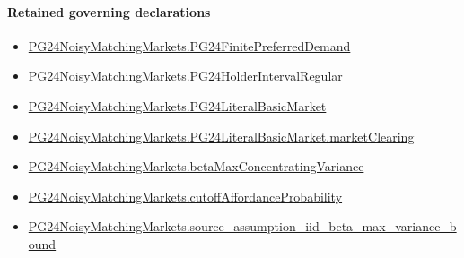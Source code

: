 \documentclass[10pt]{article}
\begin{document}
\paragraph{Retained governing declarations}
\begin{itemize}\raggedright
\item \hyperlink{governing-declaration-5abddabcc3314102}{PG24\allowbreak{}Noisy\allowbreak{}Matching\allowbreak{}Markets.\allowbreak{}PG24\allowbreak{}Finite\allowbreak{}Preferred\allowbreak{}Demand}
\item \hyperlink{governing-declaration-34ba25842cf90e86}{PG24\allowbreak{}Noisy\allowbreak{}Matching\allowbreak{}Markets.\allowbreak{}PG24\allowbreak{}Holder\allowbreak{}Interval\allowbreak{}Regular}
\item \hyperlink{paper-prerequisite-c7f1778ccec10a69}{PG24\allowbreak{}Noisy\allowbreak{}Matching\allowbreak{}Markets.\allowbreak{}PG24\allowbreak{}Literal\allowbreak{}Basic\allowbreak{}Market}
\item \hyperlink{governing-declaration-61d8d4911d878de6}{PG24\allowbreak{}Noisy\allowbreak{}Matching\allowbreak{}Markets.\allowbreak{}PG24\allowbreak{}Literal\allowbreak{}Basic\allowbreak{}Market.\allowbreak{}market\allowbreak{}Clearing}
\item \hyperlink{governing-declaration-322e8322d17fd70c}{PG24\allowbreak{}Noisy\allowbreak{}Matching\allowbreak{}Markets.\allowbreak{}beta\allowbreak{}Max\allowbreak{}Concentrating\allowbreak{}Variance}
\item \hyperlink{governing-declaration-a4a2a08d89f647e4}{PG24\allowbreak{}Noisy\allowbreak{}Matching\allowbreak{}Markets.\allowbreak{}cutoff\allowbreak{}Affordance\allowbreak{}Probability}
\item \hyperlink{governing-declaration-106a735d10bd3342}{PG24\allowbreak{}Noisy\allowbreak{}Matching\allowbreak{}Markets.\allowbreak{}source\_\allowbreak{}assumption\_\allowbreak{}iid\_\allowbreak{}beta\_\allowbreak{}max\_\allowbreak{}variance\_\allowbreak{}bound}
\end{itemize}
\end{document}

